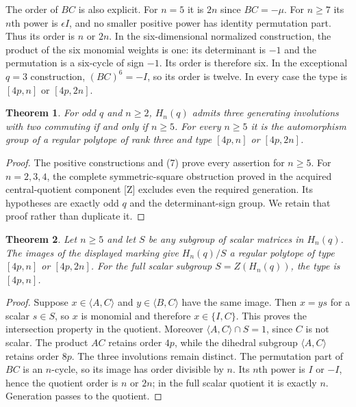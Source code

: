 \documentclass[11pt,a4paper]{article}
\newtheorem{theorem}{Theorem}
\begin{document}
The order of $BC$ is also explicit. For $n=5$ it is $2n$ since
$BC=-\mu$. For $n\ge7$ its $n$th power is $\epsilon I$, and
no smaller positive power has identity permutation part. Thus its
order is $n$ or $2n$. In the six-dimensional normalized construction,
the product of the six monomial weights is one: its determinant is
$-1$ and the permutation is a six-cycle of sign $-1$. Its order is
therefore six. In the exceptional $q=3$ construction, $(BC)^6=-I$,
so its order is twelve. In every case the type is $[4p,n]$ or
$[4p,2n]$.

\begin{theorem}
For odd $q$ and $n\ge2$, $H_n(q)$ admits three generating involutions
with two commuting if and only if $n\ge5$. For every $n\ge5$ it is
the automorphism group of a regular polytope of rank three and type
$[4p,n]$ or $[4p,2n]$.
\end{theorem}
\begin{proof}
The positive constructions and (7) prove every assertion for $n\ge5$.
For $n=2,3,4$, the complete symmetric-square obstruction proved in
the acquired central-quotient component [Z] excludes even the required
generation. Its hypotheses are exactly odd $q$ and the determinant-sign
group. We retain that proof rather than duplicate it.
\end{proof}

\begin{theorem}
Let $n\ge5$ and let $S$ be any subgroup of scalar matrices in $H_n(q)$.
The images of the displayed marking give $H_n(q)/S$ a regular polytope
of type $[4p,n]$ or $[4p,2n]$. For the full scalar subgroup
$S=Z(H_n(q))$, the type is $[4p,n]$.
\end{theorem}
\begin{proof}
Suppose $x\in\langle A,C\rangle$ and $y\in\langle B,C\rangle$
have the same image. Then $x=ys$ for a scalar $s\in S$, so $x$ is
monomial and therefore $x\in\{I,C\}$. This proves the intersection
property in the quotient. Moreover $\langle A,C\rangle\cap S=1$,
since $C$ is not scalar. The product $AC$ retains order $4p$, while the dihedral subgroup
$\langle A,C\rangle$ retains order $8p$. The three involutions remain
distinct. The permutation part of $BC$ is an
$n$-cycle, so its image has order divisible by $n$. Its $n$th power
is $I$ or $-I$, hence the quotient order is $n$ or $2n$; in the full
scalar quotient it is exactly $n$. Generation passes to the quotient.
\end{proof}
\end{document}
